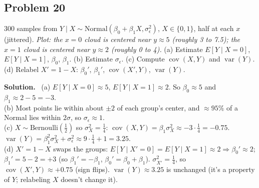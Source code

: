 \documentclass[11pt]{article}
\newcommand{\Bern}{\text{Bernoulli}}
\newcommand{\Norm}{\text{Normal}}
\newenvironment{soln}{\par\smallskip\noindent\textbf{Solution.}\ }{\par\medskip}
\begin{document}
\subsection*{Problem 20}
300 samples from $Y\mid X\sim\Norm(\beta_0+\beta_1X,\sigma_\epsilon^2)$, $X\in\{0,1\}$, half at each $x$ (jittered). \emph{Plot: the $x{=}0$ cloud is centered near $y\approx5$ (roughly 3 to 7.5); the $x{=}1$ cloud is centered near $y\approx2$ (roughly 0 to 4).}
(a) Estimate $E[Y\mid X{=}0]$, $E[Y\mid X{=}1]$, $\beta_0$, $\beta_1$. (b) Estimate $\sigma_\epsilon$. (c) Compute $\operatorname{cov}(X,Y)$ and $\operatorname{var}(Y)$. (d) Relabel $X'=1-X$: $\beta_0'$, $\beta_1'$, $\operatorname{cov}(X',Y)$, $\operatorname{var}(Y)$.
\begin{soln}
(a) $E[Y\mid X{=}0]\approx5$, $E[Y\mid X{=}1]\approx2$. So $\beta_0\approx5$ and $\beta_1\approx2-5=-3$.\\
(b) Most points lie within about $\pm2$ of each group's center, and $\approx95\%$ of a Normal lies within $2\sigma$, so $\sigma_\epsilon\approx1$.\\
(c) $X\sim\Bern(\frac12)$ so $\sigma_X^2=\frac14$: $\operatorname{cov}(X,Y)=\beta_1\sigma_X^2\approx-3\cdot\frac14=-0.75$. $\operatorname{var}(Y)=\beta_1^2\sigma_X^2+\sigma_\epsilon^2\approx9\cdot\frac14+1=3.25$.\\
(d) $X'=1-X$ swaps the groups: $E[Y\mid X'{=}0]=E[Y\mid X{=}1]\approx2\Rightarrow\beta_0'\approx2$; $\beta_1'=5-2=+3$ (so $\beta_1'=-\beta_1$, $\beta_0'=\beta_0+\beta_1$). $\sigma_{X'}^2=\frac14$, so $\operatorname{cov}(X',Y)\approx+0.75$ (sign flips). $\operatorname{var}(Y)\approx3.25$ is unchanged (it's a property of $Y$; relabeling $X$ doesn't change it).
\end{soln}

\end{document}
